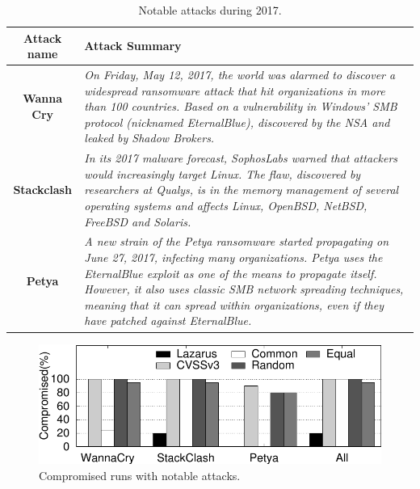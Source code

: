 \begin{table}[t]
\begin{center}
{%
\small
\begin{tabular}{ | c | p{} | }\hline
\textbf{Attack name}  & \textbf{Attack Summary}\\ \hline

\textbf{Wanna Cry} & \emph{On Friday, May 12, 2017, the world was alarmed to discover a widespread ransomware attack that hit organizations in more than 100 countries. Based on a vulnerability in Windows' SMB protocol (nicknamed EternalBlue), discovered by the NSA and leaked by Shadow Brokers.}
\\ \hline

\textbf{Stackclash} & \emph{In its 2017 malware forecast, SophosLabs warned that attackers would increasingly target Linux. The flaw, discovered by researchers at Qualys, is in the memory management of several operating systems and affects Linux, OpenBSD, NetBSD, FreeBSD and Solaris.}
\\ \hline

\textbf{Petya} & \emph{A new strain of the Petya ransomware started propagating on June 27, 2017, infecting many organizations. Petya uses the EternalBlue exploit as one of the means to propagate itself. However, it also uses classic SMB network spreading techniques, meaning that it can spread within organizations, even if they have patched against EternalBlue.}
\\ \hline


\end{tabular}
}
\vspace{2mm}
\caption{Notable attacks during 2017.}
\label{tab:attacks}
\end{center}
\end{table}

\begin{figure}[t]
\begin{center}
\includegraphics[width=\columnwidth]{images/gnuplot/attacks/attacks.pdf}
\caption{Compromised runs with notable attacks.}
\label{fig:special_vulns}
\end{center}
\end{figure}
\vspace{-1mm}


